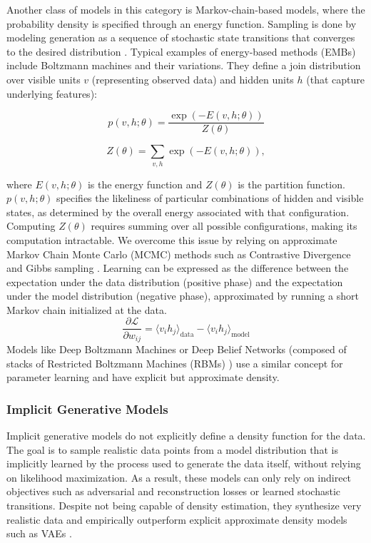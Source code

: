 Another class of models in this category is Markov-chain-based models, where the probability density is specified through an energy function. Sampling is done by modeling generation as a sequence of stochastic state transitions that converges to the desired distribution \cite{neal1993probabilistic, geman1984stochastic}. Typical examples of energy-based methods (EMBs) include Boltzmann machines \cite{hinton1984boltzmann} and their variations. They define a join distribution over visible units $v$ (representing observed data) and hidden units $h$ (that capture underlying features): 

\[
p(v,h;\theta) = \frac{\exp\left(-E(v,h;\theta)\right)}{Z(\theta)}
\]

\[
Z(\theta) = \sum_{v,h} \exp\left(-E(v,h;\theta)\right),
\]


where $E(v,h;\theta)$ is the energy function and $Z(\theta)$ is the partition function. $p(v,h;\theta)$ specifies the likeliness of particular combinations of hidden and visible states, as determined by the overall energy associated with that configuration. Computing $Z(\theta)$ requires summing over all possible configurations, making its computation intractable. We overcome this issue by relying on approximate Markov Chain Monte Carlo (MCMC) methods such as Contrastive Divergence \cite{hinton2002training} and Gibbs sampling \cite{geman1984stochastic}. Learning can be expressed as the difference between the expectation under the data distribution (positive phase) and the expectation under the model distribution (negative phase), approximated by running a short Markov chain initialized at the data.
\[
\frac{\partial \mathcal{L}}{\partial w_{ij}} = \langle v_i h_j \rangle_{\text{data}} - \langle v_i h_j \rangle_{\text{model}}
\]
 Models like Deep Boltzmann Machines \cite{salakhutdinov2009deep} or Deep Belief Networks \cite{hinton2006fast} (composed of stacks of Restricted Boltzmann Machines (RBMs) \cite{smolensky1986information}) use a similar concept for parameter learning and have explicit but approximate density. 


\subsubsection*{Implicit Generative Models}

Implicit generative models do not explicitly define a density function for the data. The goal is to sample realistic data points from a model distribution that is implicitly learned by the process used to generate the data itself, without relying on likelihood maximization. As a result, these models can only rely on indirect objectives such as adversarial and reconstruction losses or learned stochastic transitions.  Despite not being capable of density estimation, they synthesize very realistic data and empirically outperform explicit approximate density models such as VAEs \cite{kingma2013auto}. 

